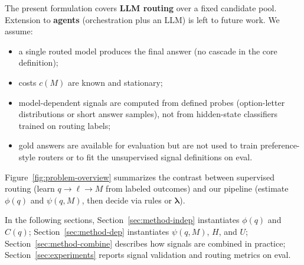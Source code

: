 The present formulation covers \textbf{LLM routing} over a fixed candidate pool.
Extension to \textbf{agents} (orchestration plus an LLM) is left to future work.
We assume:
\begin{itemize}
    \item a single routed model produces the final answer (no cascade in the core definition);
    \item costs $c(M)$ are known and stationary;
    \item model-dependent signals are computed from defined probes (option-letter distributions or short answer samples), not from hidden-state classifiers trained on routing labels;
    \item gold answers are available for evaluation but are not used to train preference-style routers or to fit the unsupervised signal definitions on eval.
\end{itemize}

Figure~\ref{fig:problem-overview} summarizes the contrast between supervised routing (learn $q\to\ell\to M$ from labeled outcomes) and our pipeline (estimate $\phi(q)$ and $\psi(q,M)$, then decide via rules or $\boldsymbol{\lambda}$).


In the following sections, Section~\ref{sec:method-indep} instantiates $\phi(q)$ and $C(q)$; Section~\ref{sec:method-dep} instantiates $\psi(q,M)$, $H$, and $U$; Section~\ref{sec:method-combine} describes how signals are combined in practice; Section~\ref{sec:experiments} reports signal validation and routing metrics on eval.
